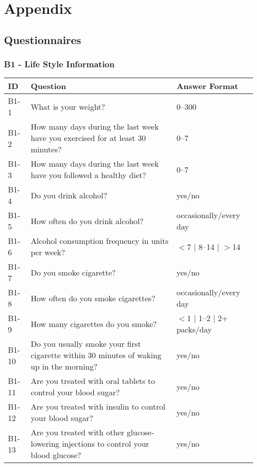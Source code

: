 \section{Appendix}

\subsection{Questionnaires}

\subsubsection{B1 - Life Style Information}
\begin{table}[H]
    \centering
    \renewcommand{\arraystretch}{1.2}
    \begin{tabularx}{\textwidth}{|l|X|l|}
        \hline
        \textbf{ID} & \textbf{Question} & \textbf{Answer Format} \\ \hline
        B1-1  & What is your weight? & 0--300 \\ \hline
        B1-2  & How many days during the last week have you exercised for at least 30 minutes? & 0--7 \\ \hline
        B1-3  & How many days during the last week have you followed a healthy diet? & 0--7 \\ \hline
        B1-4  & Do you drink alcohol? & yes/no \\ \hline
        B1-5  & How often do you drink alcohol? & occasionally/every day \\ \hline
        B1-6  & Alcohol consumption frequency in units per week? & $<$7 $\mid$ 8--14 $\mid$ $>$14 \\ \hline
        B1-7  & Do you smoke cigarette? & yes/no \\ \hline
        B1-8  & How often do you smoke cigarettes? & occasionally/every day \\ \hline
        B1-9  & How many cigarettes do you smoke? & $<$1 $\mid$ 1--2 $\mid$ 2+ packs/day \\ \hline
        B1-10 & Do you usually smoke your first cigarette within 30 minutes of waking up in the morning? & yes/no \\ \hline
        B1-11 & Are you treated with oral tablets to control your blood sugar? & yes/no \\ \hline
        B1-12 & Are you treated with insulin to control your blood sugar? & yes/no \\ \hline
        B1-13 & Are you treated with other glucose-lowering injections to control your blood glucose? & yes/no \\ \hline

\end{tabularx}
\end{table}
